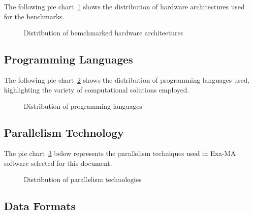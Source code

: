 The following pie chart~\ref{fig:arch} shows the distribution of hardware architectures used for the benchmarks.

\begin{figure}[H]
\centering
{}
\caption{Distribution of bemchmarked hardware architectures}
\label{fig:arch}
\end{figure}


\subsection{Programming Languages}

The following pie chart~\ref{fig:languages} shows the distribution of programming languages used, highlighting the variety of computational solutions employed.

\begin{figure}[H]
\centering
{}
\caption{Distribution of programming languages}
\label{fig:languages}
\end{figure}


\subsection{Parallelism Technology}


The pie chart~\ref{fig:parallelism} below represents the parallelism techniques used in Exa-MA software selected for this document.

\begin{figure}[H]
\centering
{}
\caption{Distribution of parallelism technologies}
\label{fig:parallelism}
\end{figure}



\subsection{Data Formats}

